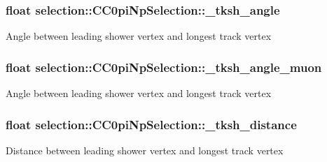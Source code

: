 \subsubsection[{\texorpdfstring{\+\_\+tksh\+\_\+angle}{_tksh_angle}}]{\setlength{\rightskip}{0pt plus 5cm}float selection\+::\+C\+C0pi\+Np\+Selection\+::\+\_\+tksh\+\_\+angle\hspace{0.3cm}{\ttfamily [private]}}\hypertarget{classselection_1_1CC0piNpSelection_a959adc6093ff4d2730dac8f75dd1245c}{}\label{classselection_1_1CC0piNpSelection_a959adc6093ff4d2730dac8f75dd1245c}
Angle between leading shower vertex and longest track vertex 
\subsubsection[{\texorpdfstring{\+\_\+tksh\+\_\+angle\+\_\+muon}{_tksh_angle_muon}}]{\setlength{\rightskip}{0pt plus 5cm}float selection\+::\+C\+C0pi\+Np\+Selection\+::\+\_\+tksh\+\_\+angle\+\_\+muon\hspace{0.3cm}{\ttfamily [private]}}\hypertarget{classselection_1_1CC0piNpSelection_a8210028b7144d3dc078201257a1a8663}{}\label{classselection_1_1CC0piNpSelection_a8210028b7144d3dc078201257a1a8663}
Angle between leading shower vertex and longest track vertex 
\subsubsection[{\texorpdfstring{\+\_\+tksh\+\_\+distance}{_tksh_distance}}]{\setlength{\rightskip}{0pt plus 5cm}float selection\+::\+C\+C0pi\+Np\+Selection\+::\+\_\+tksh\+\_\+distance\hspace{0.3cm}{\ttfamily [private]}}\hypertarget{classselection_1_1CC0piNpSelection_a73d772bb569336b56a3f14cee752e2f3}{}\label{classselection_1_1CC0piNpSelection_a73d772bb569336b56a3f14cee752e2f3}
Distance between leading shower vertex and longest track vertex 
